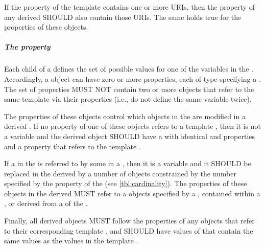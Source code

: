 If the  property of the template  contains one or more URIs, then the  property of any derived  SHOULD also contain those URIs. 
The same holds true for the  properties of these  objects.

\subparagraph{The  property}\label{sec:hasVariableComponent}

Each  child of a  defines the set of possible values for one of the variables in the .
Accordingly, a  object can have zero or more  properties, each of type  specifying a . 
The set of   properties MUST NOT contain two or more  objects that refer to the same template  via their  properties (i.e., do not define the same variable twice).

The  properties of these  objects control which  objects in the  are modified in a derived .
If no  property of one of these  objects refers to a template , then it is not a variable and the derived object SHOULD have a  with identical  and  properties
and a  property that refers to the template .

If a  in the  is referred to by some  in a , then it is a variable and it SHOULD be replaced in the derived  by a number of  objects constrained by the number specified by the  property of the  (see \ref{tbl:cardinality}).
The  properties of these  objects in the derived  MUST refer to a  objects specified by a , contained within a , or derived from a  of the .


Finally, all derived  objects MUST follow the  properties of any 
 objects that refer to their corresponding template , and SHOULD have values of  that contain the same values as the values  in the template .


